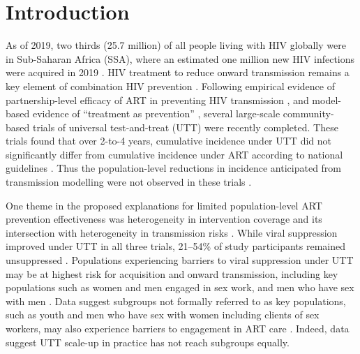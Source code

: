 \section{Introduction}
\label{s:intro}
As of 2019, two thirds (25.7 million) of all people living with HIV globally
were in Sub-Saharan Africa (SSA), where
an estimated one million new HIV infections were acquired in 2019 \cite{AIDSinfo}.
HIV treatment to reduce onward transmission remains a key element of combination HIV prevention \cite{WHO2016ART}.
Following empirical evidence of partnership-level efficacy of ART
in preventing HIV transmission \cite{Lundgren2015,Danel2015,Cohen2016},
and model-based evidence of ``treatment as prevention'' \cite{Granich2009,Eaton2012,Cori2014},
several large-scale community-based trials of universal test-and-treat (UTT) were recently completed.
These trials found that over 2-to-4 years,
cumulative incidence under UTT did not significantly differ from
cumulative incidence under ART according to national guidelines \cite{Havlir2019,Hayes2019,Iwuji2018}.
Thus the population-level reductions in incidence anticipated from transmission modelling
were not observed in these trials \cite{Baral2019,Havlir2020}.
\par
One theme in the proposed explanations for limited population-level ART prevention effectiveness
was heterogeneity in intervention coverage and its intersection with
heterogeneity in transmission risks \cite{AbdoolKarim2019,Baral2019}.  %
While viral suppression improved under UTT in all three trials,
21--54\% of study participants remained unsuppressed \cite{Iwuji2018,Havlir2019,Hayes2019}.
Populations experiencing barriers to viral suppression under UTT
may be at highest risk for acquisition and onward transmission, including key populations such as
women and men engaged in sex work, and men who have sex with men \cite{Hakim2018,Nyato2019}.
Data suggest subgroups not formally referred to as key populations, such as youth and men who have sex with women including clients of sex workers, may also
experience barriers to engagement in ART care \cite{Green2020,Quinn2019}.
Indeed, data suggest UTT scale-up in practice has not reach subgroups equally. %
